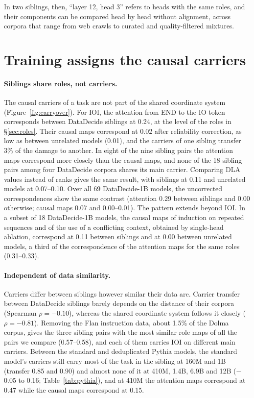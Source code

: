 \documentclass[11pt]{article}
\begin{document}
In two siblings, then, ``layer 12, head 3'' refers to heads with the same roles, and their components can be compared head by head without alignment, across corpora that range from web crawls to curated and quality-filtered mixtures.

\section{Training assigns the causal carriers}
\label{sec:carriers}

\paragraph{Siblings share roles, not carriers.}
The causal carriers of a task are not part of the shared coordinate system (Figure~\ref{fig:carryover}).
For IOI, the attention from END to the IO token corresponds between DataDecide siblings at 0.24, at the level of the roles in \S\ref{sec:roles}.
Their causal maps correspond at 0.02 after reliability correction, as low as between unrelated models (0.01), and the carriers of one sibling transfer 3\% of the damage to another.
In eight of the nine sibling pairs the attention maps correspond more closely than the causal maps, and none of the 18 sibling pairs among four DataDecide corpora shares its main carrier.
Comparing DLA values instead of ranks gives the same result, with siblings at 0.11 and unrelated models at 0.07--0.10.
Over all 69 DataDecide-1B models, the uncorrected correspondences show the same contrast (attention 0.29 between siblings and 0.00 otherwise; causal maps 0.07 and 0.00--0.01).
The pattern extends beyond IOI.
In a subset of 18 DataDecide-1B models, the causal maps of induction on repeated sequences and of the use of a conflicting context, obtained by single-head ablation, correspond at 0.11 between siblings and at 0.00 between unrelated models, a third of the correspondence of the attention maps for the same roles (0.31--0.33).

\paragraph{Independent of data similarity.}
Carriers differ between siblings however similar their data are.
Carrier transfer between DataDecide siblings barely depends on the distance of their corpora (Spearman $\rho = -0.10$), whereas the shared coordinate system follows it closely ($\rho = -0.81$).
Removing the Flan instruction data, about 1.5\% of the Dolma corpus, gives the three sibling pairs with the most similar role maps of all the pairs we compare (0.57--0.58), and each of them carries IOI on different main carriers.
Between the standard and deduplicated Pythia models, the standard model's carriers still carry most of the task in the sibling at 160M and 1B (transfer 0.85 and 0.90) and almost none of it at 410M, 1.4B, 6.9B and 12B ($-$0.05 to 0.16; Table~\ref{tab:pythia}), and at 410M the attention maps correspond at 0.47 while the causal maps correspond at 0.15.
\end{document}
